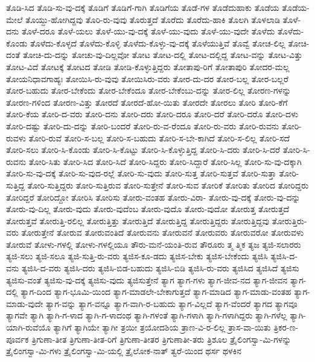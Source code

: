 {ತೊಡಿ-ಸಿದ
ತೊಡಿ-ಸು-ವು-ದಕ್ಕೆ
ತೊಡಿಗೆ
ತೊಡಿಗೆ-ಗಾಗಿ
ತೊಡಿಗೆಯ
ತೊಡೆ-ಗಳ
ತೊಡೆದುಹಾಕು
ತೊಡೆಯ
ತೊಡೆಯ-ಮೇಲೆ
ತೊಯ್ದು-ಹೋಗಿದ್ದವು
ತೊರಿ-ರು-ವುವು
ತೊರುತ್ತದೆ
ತೊರೆದು
ತೊರೆದು-ಹಾಕಿ
ತೊಲಗಿ
ತೊಳಲಾಡಿ
ತೊಳೆ-ದನು
ತೊಳೆ-ದರೂ
ತೊಳೆ-ಯಲು
ತೊಳೆ-ಯು-ವು-ದಕ್ಕೆ
ತೊಳೆ-ಯು-ವುದು
ತೊಳೆ-ಯು-ವುದೇ
ತೊಳೆದು
ತೊಳೆದು-ಕೊಂಡು
ತೊಳೆದು-ಕೊಳ್ಳದೆ
ತೊಳೆದು-ಕೊಳ್ಳಿ
ತೊಳೆದು-ಕೊಳ್ಳು-ವು-ದಕ್ಕೆ
ತೊಳೆಯುತ್ತಿವೆ
ತೊವ್ವೆ
ತೋಚ-ಲಿಲ್ಲ
ತೋಚಿ-ದಂತೆ
ತೋಚಿ-ದು-ದನ್ನು
ತೋಚು-ವು-ದಿಲ್ಲವೋ
ತೋಟ
ತೋಟ-ದಲ್ಲಿ
ತೋಟ-ದಲ್ಲಿದ್ದ
ತೋಟ-ವನ್ನು
ತೋಟ-ವಿತ್ತು
ತೋಟ-ವಿದೆ
ತೋಟಕ್ಕೆ
ತೋಟದ
ತೋಡಿ
ತೋಡಿ-ಕೊಳ್ಳುತ್ತಿದ್ದರು
ತೋತಾಪು-ರಿಗೆ
ತೋತಾಪುರಿ
ತೋದರ-ಮಲ್ಲ
ತೋಯನಿಧಾವಗಾಹ್ಯಃ
ತೋಯಿಸಿ-ರು-ವುವು
ತೋಯಿಸಿರು-ವರು
ತೋರ-ದು-ದರ
ತೋರ-ಬಲ್ಲ
ತೋರ-ಬಲ್ಲರೆ
ತೋರ-ಬಹುದು
ತೋರ-ಬೇಕೆಂದು
ತೋರ-ಬೇಕೆಂದೂ
ತೋರ-ಬೇಕೆಂಬು-ದನ್ನು
ತೋರ-ಲಿಲ್ಲ
ತೋರಣ-ಗಳನ್ನು
ತೋರಣ-ಗಳಿಂದ
ತೋರಣ-ವಿತ್ತು
ತೋರದೆ
ತೋರದೆ-ಹೋ-ಯಿತು
ತೋರದೇ
ತೋರಲು
ತೋರಿ
ತೋರಿ-ಕೆಗೆ
ತೋರಿ-ಕೆಯ
ತೋರಿ-ದ-ವರು
ತೋರಿ-ದನು
ತೋರಿ-ದರು
ತೋರಿ-ದರೂ
ತೋರಿ-ದರೆ
ತೋರಿ-ದರೊ
ತೋರಿ-ದಳು
ತೋರಿ-ದಷ್ಟು
ತೋರಿ-ದು-ದನ್ನು
ತೋರಿ-ಬಂದರೆ
ತೋರಿ-ರು-ವ-ರೆಂದೂ
ತೋರಿ-ರು-ವರು
ತೋರಿ-ರುವನು
ತೋರಿ-ರುವಳು
ತೋರಿ-ರುವೆ
ತೋರಿ-ಸ-ಬಲ್ಲ
ತೋರಿ-ಸ-ಬಹುದು
ತೋರಿ-ಸ-ಬೇ-ಕಾಗಿದೆ
ತೋರಿ-ಸ-ಲಿಲ್ಲ
ತೋರಿ-ಸದೆ
ತೋರಿ-ಸಲು
ತೋರಿ-ಸಿ-ಕೊಂಡು
ತೋರಿ-ಸಿ-ಕೊಟ್ಟು
ತೋರಿ-ಸಿ-ಕೊಳ್ಳುತ್ತಿದ್ದ
ತೋರಿ-ಸಿ-ದರು
ತೋರಿ-ಸಿ-ದರೆ
ತೋರಿ-ಸಿ-ರುವನು
ತೋರಿ-ಸಿತು
ತೋರಿ-ಸಿದ
ತೋರಿ-ಸಿದೆ
ತೋರಿ-ಸಿದ್ದರು
ತೋರಿ-ಸಿದ್ದಾರೆ
ತೋರಿ-ಸಿಲ್ಲ
ತೋರಿ-ಸು-ವು-ದಕ್ಕಾಗಿ
ತೋರಿ-ಸು-ವು-ದಕ್ಕೆ
ತೋರಿ-ಸು-ವುದ-ರಲ್ಲೆ
ತೋರಿ-ಸು-ವುದು
ತೋರಿ-ಸುತ್ತ
ತೋರಿ-ಸುತ್ತವೆ
ತೋರಿ-ಸುತ್ತಾ
ತೋರಿ-ಸುತ್ತಿದ್ದ
ತೋರಿ-ಸುತ್ತಿದ್ದರು
ತೋರಿ-ಸುತ್ತಿರುವ
ತೋರಿ-ಸುತ್ತೇನೆ
ತೋರಿ-ಸುವ
ತೋರಿಕೆ
ತೋರಿತು
ತೋರಿದ
ತೋರಿದ್ದರು
ತೋರಿದ್ದರೆ
ತೋರಿದ್ದೋ
ತೋರಿಸಿ
ತೋರಿಸು
ತೋರು-ವಂತಹ
ತೋರು-ವಿರಾ-
ತೋರು-ವು-ದಕ್ಕೆ
ತೋರು-ವು-ದನ್ನು
ತೋರು-ವು-ದಿಲ್ಲ
ತೋರು-ವುದು
ತೋರು-ವುದೆಂಬ
ತೋರು-ವುದೊ
ತೋರು-ವುದೋ
ತೋರುತ್ತ
ತೋರುತ್ತದೆ
ತೋರುತ್ತವೆ
ತೋರುತ್ತಿ-ರಲಿಲ್ಲ
ತೋರುತ್ತಿತ್ತು
ತೋರುತ್ತಿದೆ
ತೋರುತ್ತಿದ್ದ
ತೋರುತ್ತಿದ್ದರು
ತೋರುತ್ತಿದ್ದವು
ತೋರುತ್ತಿರು-ವರು
ತೋರುತ್ತೇನೆ
ತೋರುವ
ತೋರುವಂತಿದೆ
ತೋರುವನು
ತೋರುವನೆ
ತೋರುವರು
ತೋರುವರೋ
ತೋರುವಳು
ತೋರುವೆ
ತೋಳು-ಗಳಲ್ಲಿ
ತೋಳು-ಗಳಲ್ಲಿಯೂ
ತೌರು-ಮನೆ-ಯಂತಿ-ರುವ
ತೌರೂರು
ತ್ಮ
ತ್ಮಿಕ
ತ್ಯಜ
ತ್ಯಜಿ-ಸಲಾರರು
ತ್ಯಜಿ-ಸಲು
ತ್ಯಜಿ-ಸಲೂ
ತ್ಯಜಿ-ಸುತ್ತಿ-ರು-ವರು
ತ್ಯಜಿಸ-ಕೂ-ಡದು
ತ್ಯಜಿಸ-ಬೇಕು
ತ್ಯಜಿಸ-ಬೇಕೆಂದು
ತ್ಯಜಿಸಿ
ತ್ಯಜಿಸಿ-ದ-ವನು
ತ್ಯಜಿಸಿ-ದ-ವರು
ತ್ಯಜಿಸಿ-ದರು
ತ್ಯಜಿಸಿ-ಬಿಡ-ಬಹುದು
ತ್ಯಜಿಸಿ-ಬಿಡಿ
ತ್ಯಜಿಸಿ-ರು-ವರು
ತ್ಯಜಿಸಿದ
ತ್ಯಜಿಸಿದೆ
ತ್ಯಜಿಸು
ತ್ಯಜಿಸು-ವಂತೆ
ತ್ಯಜಿಸು-ವು-ದಕ್ಕೆ
ತ್ಯಜಿಸು-ವುದು
ತ್ಯಜಿಸುತ್ತೇನೆ
ತ್ಯಾಗ
ತ್ಯಾಗ-ಗಳು
ತ್ಯಾಗ-ಜೀವ-ನದ
ತ್ಯಾಗ-ಜೀವನ
ತ್ಯಾಗ-ದಲ್ಲಿ
ತ್ಯಾಗ-ದಿಂದ
ತ್ಯಾಗ-ಭೂಮಿ-ಯಿಂದ
ತ್ಯಾಗ-ಮಾಡಲೇ-ಬೇಕಾಗುತ್ತದೆ
ತ್ಯಾಗ-ಮಾಡಿದ
ತ್ಯಾಗ-ಮಾಡು-ವಂತಹ
ತ್ಯಾಗ-ಮಾಡು-ವುದೇ
ತ್ಯಾಗ-ವನ್ನು
ತ್ಯಾಗ-ವನ್ನೂ
ತ್ಯಾಗ-ವಾಗಿ-ರ-ಬಹುದು
ತ್ಯಾಗ-ವಿಲ್ಲದೆ
ತ್ಯಾಗ-ವೆಂದರೆ
ತ್ಯಾಗದ
ತ್ಯಾಗವೂ
ತ್ಯಾಗವೇ
ತ್ಯಾಗಿ
ತ್ಯಾಗಿ-ಗ-ಳಾದ
ತ್ಯಾಗಿ-ಗ-ಳಾದಂಥ
ತ್ಯಾಗಿ-ಗಳಂತೆ
ತ್ಯಾಗಿ-ಗಳಾಗಿ
ತ್ಯಾಗಿ-ಗಳಾಗಿದ್ದರು
ತ್ಯಾಗಿ-ಗಳೆಲ್ಲ
ತ್ಯಾಗಿ-ಯಾಗಿ-ರುವೆಯೊ
ತ್ಯಾಗಿಗೆ
ತ್ಯಾಗಿಯೇ
ತ್ಯಾಗೀ
ತ್ರಯೀ
ತ್ರಯೋದಶಿಯ
ತ್ರಾಣ-ವಿ-ರ-ಲಿಲ್ಲ
ತ್ರಾಸ-ವಾ-ಯಿತು
ತ್ರಿಕರ-ಣ-ಪೂರ್ವಕ
ತ್ರಿಗುಣಾ-ತೀತ
ತ್ರಿಗುಣಾ-ತೀತ-ರಿಗೆ
ತ್ರಿಗುಣಾ-ತೀತರ
ತ್ರಿಗುಣಾತೀ-ತರು
ತ್ರಿಶೂಲ
ತ್ರೈಲಿಂಗಸ್ವಾ-ಮಿ-ಗಳನ್ನು
ತ್ರೈಲಿಂಗಸ್ವಾ-ಮಿ-ಗಳು
ತ್ರೈಲಿಂಗಸ್ವಾ-ಮಿ-ಯಲ್ಲಿ
ತ್ರೈಲೋಕ-ನಾತ್
ತ್ವರೆ-ಯಿಂದ
ಥರ್ಸ
ಥಳಕಿನ
}
